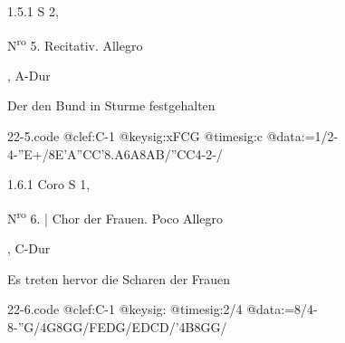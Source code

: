 \documentclass[a4paper, twocolumn, 11pt]{book}
\begin{document}
\newline %
\par 1.5.1  S 2, \begin{itshape}N\textsuperscript{r}\textsuperscript{o} 5. Recitativ. Allegro\end{itshape}, A-Dur\newline \begin{footnotesize} Der den Bund in Sturme festgehalten \end{footnotesize}  
\begin{filecontents*}{22-5.code}
@clef:C-1
@keysig:xFCG
@timesig:c
@data:=1/2-4-''E+/8E'A''CC'8.A6A8AB/''CC4-2-/
\end{filecontents*}

\newline %
\par 1.6.1  Coro S 1, \begin{itshape}N\textsuperscript{r}\textsuperscript{o} 6. | Chor der Frauen. Poco Allegro\end{itshape}, C-Dur\newline \begin{footnotesize} Es treten hervor die Scharen der Frauen \end{footnotesize}  
\begin{filecontents*}{22-6.code}
@clef:C-1
@keysig:
@timesig:2/4
@data:=8/4-8-''G/4G8GG/{FE}{DG}/{ED}CD/'4B8GG/
\end{filecontents*}
\end{document}
